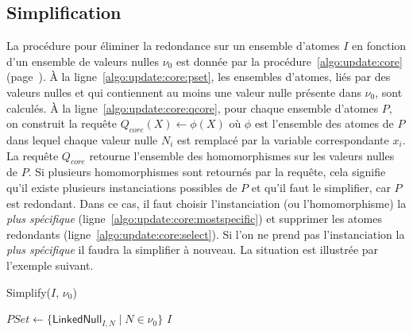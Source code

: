 \subsection{Simplification}
La procédure pour éliminer la redondance sur un ensemble d'atomes $I$ en fonction d'un ensemble de valeurs nulles $\nu_0$ est donnée par la procédure~\ref{algo:update:core} (page~\pageref{algo:update:core}).
À la ligne~\ref{algo:update:core:pset}, les ensembles d'atomes, liés par des valeurs nulles et qui contiennent au moins une valeur nulle présente dans $\nu_0$, sont calculés.
À la ligne~\ref{algo:update:core:qcore}, pour chaque ensemble d'atomes $P$, on construit la requête $Q_{core}(X) \gets \phi(X)$ où $\phi$ est l'ensemble des atomes de $P$ dans lequel chaque valeur nulle $N_i$ est remplacé par la variable correspondante $x_i$.
La requête $Q_{core}$ retourne l'ensemble des homomorphismes sur les valeurs nulles de $P$.
Si plusieurs homomorphismes sont retournés par la requête, cela signifie qu'il existe plusieurs instanciations possibles de $P$ et qu'il faut le simplifier, car $P$ est redondant.
Dans ce cas, il faut choisir l'instanciation (ou l'homomorphisme) la \textit{plus spécifique} (ligne~\ref{algo:update:core:mostspecific}) et supprimer les atomes redondants (ligne~\ref{algo:update:core:select}).
Si l'on ne prend pas l'instanciation la \textit{plus spécifique} il faudra la simplifier à nouveau.
La situation est illustrée par l'exemple suivant.

\begin{procedure}[htb]
	\caption{Simplify($I$, $\nu_0$)}
	\label{algo:update:core}

	$PSet \gets \{\textsf{LinkedNull}_{I,N} \mid N \in \nu_0\}$\; \label{algo:update:core:pset}
	\Return $I$\;
\end{procedure}

